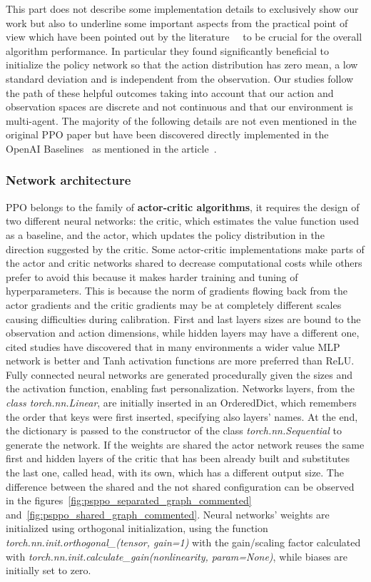 \documentclass[11pt, a4paper, hidelinks]{report}
\begin{document}
This part does not describe some implementation details to exclusively show our work but also to underline some important aspects from the practical point of view which have been pointed out by the literature~\citep{ppo-implementation-1}~\citep{ppo-implementation-2} to be crucial for the overall algorithm performance.
In particular they found significantly beneficial to initialize the policy network so that the action distribution has zero mean, a low standard deviation and is independent from the observation.
Our studies follow the path of these helpful outcomes taking into account that our action and observation spaces are discrete and not continuous and that our environment is multi-agent.
The majority of the following details are not even mentioned in the original PPO paper but have been discovered directly implemented in the OpenAI Baselines~\citep{ppo-baselines} as mentioned in the article~\citep{ppo-32-implementations-details}.

\subsubsection{Network architecture}

PPO belongs to the family of \textbf{actor-critic algorithms}, it requires the design of two different neural networks: the critic, which estimates the value function used as a baseline, and the actor, which updates the policy distribution in the direction suggested by the critic.
Some actor-critic implementations make parts of the actor and critic networks shared to decrease computational costs while others prefer to avoid this because it makes harder training and tuning of hyperparameters.
This is because the norm of gradients flowing back from the actor gradients and the critic gradients may be at completely different scales causing difficulties during calibration.
First and last layers sizes are bound to the observation and action dimensions, while hidden layers may have a different one, cited studies have discovered that in many environments a wider value MLP network is better and Tanh activation functions are more preferred than ReLU\@.
Fully connected neural networks are generated procedurally given the sizes and the activation function, enabling fast personalization.
Networks layers, from the \textit{class torch.nn.Linear}, are initially inserted in an OrderedDict, which remembers the order that keys were first inserted, specifying also layers' names.
At the end, the dictionary is passed to the constructor of the class \textit{torch.nn.Sequential} to generate the network.
If the weights are shared the actor network reuses the same first and hidden layers of the critic that has been already built and substitutes the last one, called head, with its own, which has a different output size.
The difference between the shared and the not shared configuration can be observed in the figures~\ref{fig:psppo_separated_graph_commented} and~\ref{fig:psppo_shared_graph_commented}.
Neural networks' weights are initialized using orthogonal initialization, using the function \textit{torch.nn.init.orthogonal\_(tensor, gain=1)} with the gain/scaling factor calculated with \textit{torch.nn.init.calculate\_gain(nonlinearity, param=None)}, while biases are initially set to zero.
\end{document}
